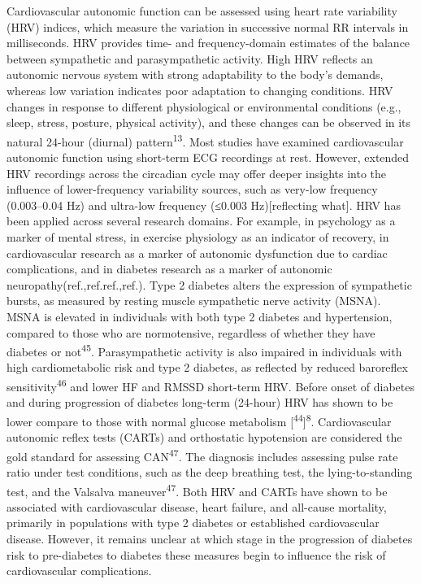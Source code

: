 \documentclass[
  a4paper,
  headsepline=true,
  open=any]{scrbook}
\begin{document}
Cardiovascular autonomic function can be assessed using heart rate
variability (HRV) indices, which measure the variation in successive
normal RR intervals in milliseconds. HRV provides time- and
frequency-domain estimates of the balance between sympathetic and
parasympathetic activity. High HRV reflects an autonomic nervous system
with strong adaptability to the body's demands, whereas low variation
indicates poor adaptation to changing conditions. HRV changes in
response to different physiological or environmental conditions (e.g.,
sleep, stress, posture, physical activity), and these changes can be
observed in its natural 24-hour (diurnal) pattern\textsuperscript{13}.
Most studies have examined cardiovascular autonomic function using
short-term ECG recordings at rest. However, extended HRV recordings
across the circadian cycle may offer deeper insights into the influence
of lower-frequency variability sources, such as very-low frequency
(0.003--0.04 Hz) and ultra-low frequency (≤0.003 Hz){[}reflecting
what{]}. HRV has been applied across several research domains. For
example, in psychology as a marker of mental stress, in exercise
physiology as an indicator of recovery, in cardiovascular research as a
marker of autonomic dysfunction due to cardiac complications, and in
diabetes research as a marker of autonomic
neuropathy(ref.,ref.ref.,ref.). Type 2 diabetes alters the expression of
sympathetic bursts, as measured by resting muscle sympathetic nerve
activity (MSNA). MSNA is elevated in individuals with both type 2
diabetes and hypertension, compared to those who are normotensive,
regardless of whether they have diabetes or not\textsuperscript{45}.
Parasympathetic activity is also impaired in individuals with high
cardiometabolic risk and type 2 diabetes, as reflected by reduced
baroreflex sensitivity\textsuperscript{46} and lower HF and RMSSD
short-term HRV. Before onset of diabetes and during progression of
diabetes long-term (24-hour) HRV has shown to be lower compare to those
with normal glucose metabolism
{[}\textsuperscript{44}{]}\textsuperscript{8}. Cardiovascular autonomic
reflex tests (CARTs) and orthostatic hypotension are considered the gold
standard for assessing CAN\textsuperscript{47}. The diagnosis includes
assessing pulse rate ratio under test conditions, such as the deep
breathing test, the lying-to-standing test, and the Valsalva
maneuver\textsuperscript{47}. Both HRV and CARTs have shown to be
associated with cardiovascular disease, heart failure, and all-cause
mortality, primarily in populations with type 2 diabetes or established
cardiovascular disease. However, it remains unclear at which stage in
the progression of diabetes risk to pre-diabetes to diabetes these
measures begin to influence the risk of cardiovascular complications.
\end{document}

